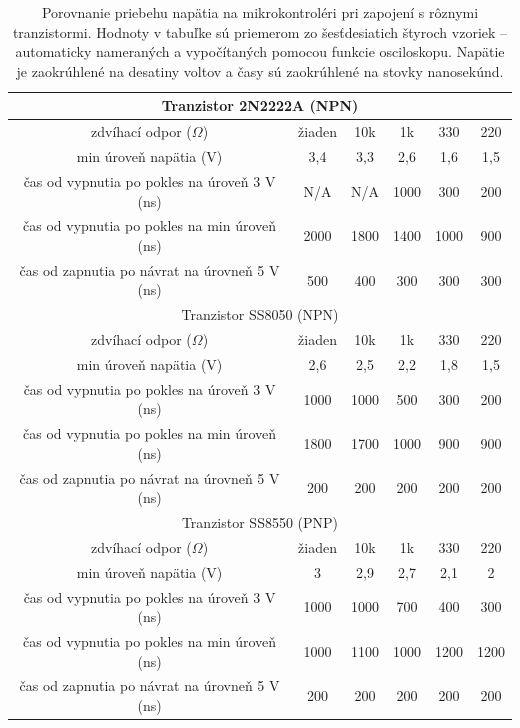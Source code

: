 \begin{table}
    \caption[Porovnanie priebehu napätia pri zapojení s rôznymi tranzistormi]{Porovnanie priebehu napätia na mikrokontroléri pri zapojení s rôznymi tranzistormi. Hodnoty v tabuľke sú priemerom zo šesťdesiatich štyroch vzoriek -- automaticky nameraných a vypočítaných pomocou funkcie osciloskopu. Napätie je zaokrúhlené na desatiny voltov a časy sú zaokrúhlené na stovky nanosekúnd.}
    \label{tab:oscVoltage}
    \begin{center}
    \begin{tabular}{|c|c|c|c|c|c|}
        \hline
        \multicolumn{6}{|c|}{Tranzistor 2N2222A (NPN)} \\
        \hline 
        zdvíhací odpor ($\Omega$) & žiaden & 10k & 1k & 330 & 220 \\
        \hline
        min úroveň napätia (V) & 3,4 & 3,3 & 2,6 & 1,6 & 1,5 \\
        \hline
        čas od vypnutia po pokles na úroveň 3 V (ns) & N/A & N/A & 1000 & 300 & 200 \\
        \hline
        čas od vypnutia po pokles na min úroveň (ns) & 2000 & 1800 & 1400 & 1000 & 900 \\
        \hline
        čas od zapnutia po návrat na úrovneň 5 V (ns) & 500 & 400 & 300 & 300 & 300 \\
        \hline
        \multicolumn{6}{|c|}{Tranzistor SS8050 (NPN)} \\
        \hline 
        zdvíhací odpor ($\Omega$) & žiaden & 10k & 1k & 330 & 220 \\
        \hline
        min úroveň napätia (V) & 2,6 & 2,5 & 2,2 & 1,8 & 1,5 \\
        \hline
        čas od vypnutia po pokles na úroveň 3 V (ns) & 1000 & 1000 & 500 & 300 & 200 \\
        \hline
        čas od vypnutia po pokles na min úroveň (ns) & 1800 & 1700 & 1000 & 900 & 900 \\
        \hline
        čas od zapnutia po návrat na úrovneň 5 V (ns) & 200 & 200 & 200 & 200 & 200 \\
        \hline
        \multicolumn{6}{|c|}{Tranzistor SS8550 (PNP)} \\
        \hline 
        zdvíhací odpor ($\Omega$) & žiaden & 10k & 1k & 330 & 220 \\
        \hline
        min úroveň napätia (V) & 3 & 2,9 & 2,7 & 2,1 & 2 \\
        \hline
        čas od vypnutia po pokles na úroveň 3 V (ns) & 1000 & 1000 & 700 & 400 & 300 \\
        \hline
        čas od vypnutia po pokles na min úroveň (ns) & 1000 & 1100 & 1000 & 1200 & 1200 \\
        \hline
        čas od zapnutia po návrat na úrovneň 5 V (ns) & 200 & 200 & 200 & 200 & 200 \\
        \hline
    \end{tabular}
    \end{center}
\end{table}

